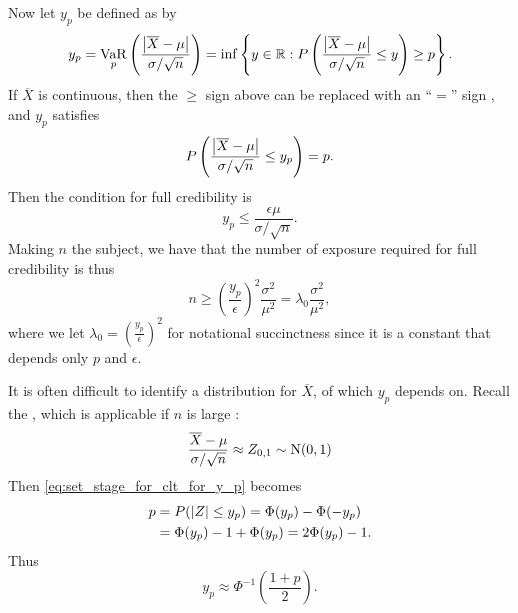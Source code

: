 \documentclass[notoc,notitlepage]{tufte-book}
\DeclareMathOperator{\VaR}{VaR}
\begin{document}
Now let $y_p$ be defined as by
\begin{equation*}
  y_p = \VaR_p \left( \frac{\abs{\overline{X} - \mu}}{\sigma / \sqrt{n}} \right)
  = \inf \left\{ y \in \mathbb{R} : P \left( \frac{\abs{\overline{X} -
  \mu}}{\sigma / \sqrt{n}} \leq y \right) \geq p \right\}.
\end{equation*}
If $\overline{X}$ is continuous, then the $\geq$ sign above can be replaced with
an ``$=$'' sign , and $y_p$
satisfies
\begin{equation}\label{eq:set_stage_for_clt_for_y_p}
  P \left( \frac{\left|\overline{X} - \mu\right|}{\sigma / \sqrt{n}} \leq y_p \right) = p.
\end{equation}
Then the condition for full credibility is
\begin{equation*}
  y_p \leq \frac{\epsilon\mu}{\sigma / \sqrt{n}}.
\end{equation*}
Making $n$ the subject, we have that the number of exposure required for full
credibility is thus
\begin{equation}\label{eq:num_of_exposure_for_full_cred}
  n \geq \left( \frac{y_p}{\epsilon} \right)^2 \frac{\sigma^2}{\mu^2} =
  \lambda_0 \frac{\sigma^2}{\mu^2},
\end{equation}
where we let $\lambda_0 = \left(\frac{y_p}{\epsilon}\right)^2$ for notational
succinctness since it is a constant that depends only $p$ and $\epsilon$.

It is often difficult to identify a distribution for $\overline{X}$, of which
$y_p$ depends on. Recall the , which is applicable
if $n$ is large :
\begin{equation*}
  \frac{\overline{X} - \mu}{\sigma / \sqrt{n}} \approx Z_{0, 1} \sim \operatorname{N}(0, 1)
\end{equation*}
Then \cref{eq:set_stage_for_clt_for_y_p} becomes
\begin{align*}
  p &= P(\left|Z\right| \leq y_p) = \Phi(y_p) - \Phi(-y_p) \\
    &= \Phi(y_p) - 1 + \Phi(y_p) = 2 \Phi(y_p) - 1.
\end{align*}
Thus
\begin{equation*}
  y_p \approx \Phi^{-1} \left( \frac{1 + p}{2} \right).
\end{equation*}
\end{document}
